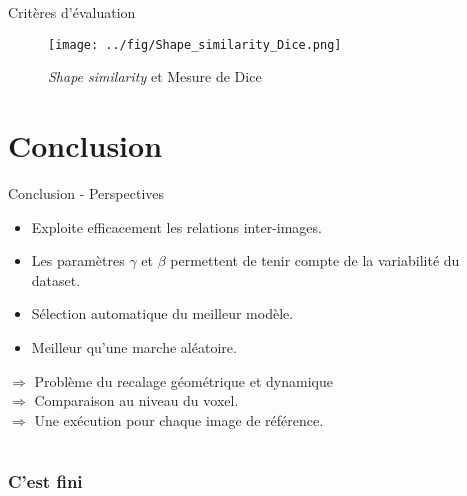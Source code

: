 \documentclass{beamer}
\begin{document}
\begin{frame}{Critères d'évaluation}
\begin{figure}[h]
  \begin{center}
    \caption{\textit{Shape similarity} et Mesure de Dice}
      \texttt{[image: ../fig/Shape\_similarity\_Dice.png]}
      \label{fig:similarities}
  \end{center}
\end{figure}
\end{frame}


\section{Conclusion}
\begin{frame}{Conclusion - Perspectives}
\begin{itemize}
\item Exploite efficacement les relations inter-images.
\item Les paramètres $\gamma$ et $\beta$ permettent de tenir compte de la variabilité du dataset.
\item Sélection automatique du meilleur modèle.
\item Meilleur qu'une marche aléatoire.
\end{itemize}

 \vspace{0.5cm}
  $\Rightarrow$ Problème du recalage géométrique et dynamique\\
  $\Rightarrow$ Comparaison au niveau du voxel. \\
  $\Rightarrow$ Une exécution pour chaque image de référence.
\end{frame}
\section{}

\begin{frame}[noframenumbering]
  \frametitle{C'est fini}
\end{frame}
\end{document}
